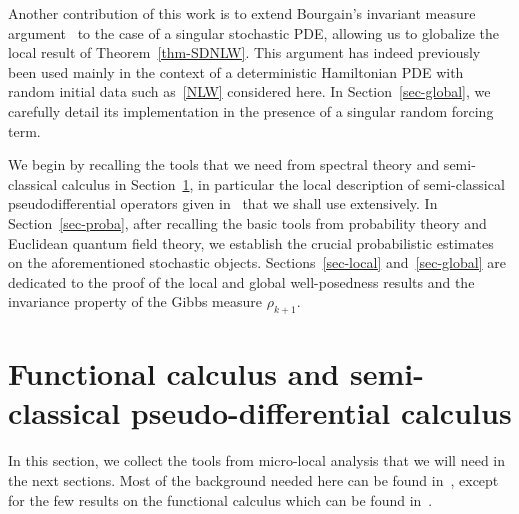 \documentclass[10pt]{amsart}
\theoremstyle{definition}\newtheorem{defi}[theo]{Definition}\newtheorem{rema}[theo]{Remark}\newtheorem{exam}[theo]{Example}\newtheorem{exem}[theo]{Example}\newtheorem{nota}[theo]{Notation}
\begin{document}
Another contribution of this work is to extend Bourgain's invariant measure argument~\cite{BO94,BO96} to the case of a singular stochastic PDE, allowing us to globalize the local result of Theorem~\ref{thm-SDNLW}. This argument has indeed previously been used mainly in the context of a deterministic Hamiltonian PDE with random initial data such as~\eqref{NLW} considered here. In Section~\ref{sec-global}, we carefully detail its implementation in the presence of a singular random forcing term.

We begin by recalling the tools that we need from spectral theory and semi-classical calculus in Section~\ref{SEC:PDO}, in particular the local description of semi-classical pseudodifferential operators given in~\cite{BGT} that we shall use extensively. In Section~\ref{sec-proba}, after recalling the basic tools from probability theory and Euclidean quantum field theory, we establish the crucial probabilistic estimates on the aforementioned stochastic objects. Sections~\ref{sec-local} and~\ref{sec-global} are dedicated to the proof of the local and global well-posedness results and the invariance property of the Gibbs measure $\rho_{k+1}$.

\section{Functional calculus and semi-classical pseudo-differential calculus}\label{SEC:PDO}

In this section, we collect the tools from micro-local analysis that we will need in the next sections. Most of the background needed here can be found in~\cite{Zworski}, except for the few results on the functional calculus which can be found in~\cite{Davies}.
\end{document}
